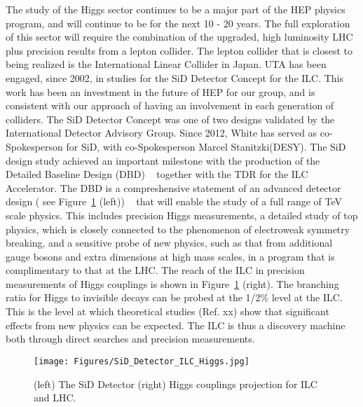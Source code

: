 The study of the Higgs sector continues to be a major part of the HEP physics program, and will continue to be for 
the next 10 - 20 years.
The full exploration of this sector will require the combination of the upgraded, high luminosity LHC plus precision
results from a lepton collider. The lepton collider that is closest to being realized is the International Linear Collider
in Japan. UTA has been engaged, since 2002, in studies for the SiD Detector Concept for the ILC. 
This work has been an investment in the future of HEP for our group, and is 
consistent with our approach of having an involvement in each generation of colliders. The SiD Detector Concept
was one of two designs validated by the International Detector Advisory Group.
Since 2012, White has served as co-Spokesperson for SiD, with co-Spokesperson Marcel Stanitzki(DESY).
The SiD design study achieved an important milestone with the production of the Detailed Baseline 
Design (DBD) ~\cite{SiDDBD} together with the TDR for the ILC Accelerator. 
The DBD is a compreshensive statement of an advanced detector design ( see Figure~\ref{fig:SiD_Detector} (left)) ~\cite{SiDDet} that will
enable the study of a full range of TeV scale physics. This includes precision Higgs 
measurements, a detailed study of top physics, which is closely connected to the
phenomenon of electroweak symmetry breaking, and a sensitive probe of new physics, such as that from 
additional gauge bosons and extra dimensions at high mass scales, in a program that is complimentary
to that at the LHC. The reach of the ILC in precision measurements of Higgs couplings is shown in 
Figure~\ref{fig:SiD_Detector} (right). The branching ratio for Higgs to invisible decays can be probed at the 1/2\% level 
at the ILC. This is the level at which theoretical studies (Ref. xx) show that significant effects from new physics can be expected.
The ILC is thus a discovery machine both through direct searches and precision measurements.

\begin{figure}[htb]
\centering

      \texttt{[image: Figures/SiD\_Detector\_ILC\_Higgs.jpg]}
      \label{fig:SiD_Detector}

\caption{(left) The SiD Detector (right) Higgs couplings projection for ILC and LHC.}
\end{figure}

